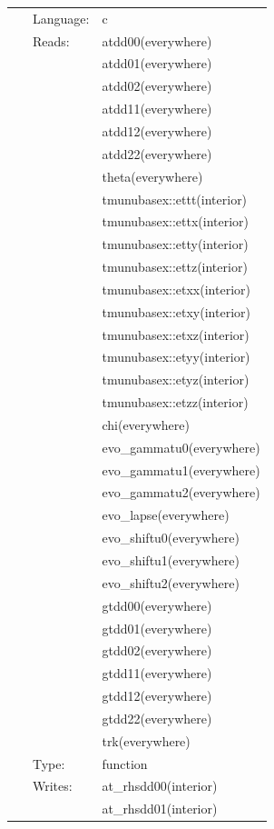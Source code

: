 \documentclass{article}
\begin{document}
 \begin{tabular*}{160mm}{cll} 
~ & Language:  & c \\ 
~ & Reads:  & atdd00(everywhere) \\ 
~& ~ &atdd01(everywhere)\\ 
~& ~ &atdd02(everywhere)\\ 
~& ~ &atdd11(everywhere)\\ 
~& ~ &atdd12(everywhere)\\ 
~& ~ &atdd22(everywhere)\\ 
~& ~ &theta(everywhere)\\ 
~& ~ &tmunubasex::ettt(interior)\\ 
~& ~ &tmunubasex::ettx(interior)\\ 
~& ~ &tmunubasex::etty(interior)\\ 
~& ~ &tmunubasex::ettz(interior)\\ 
~& ~ &tmunubasex::etxx(interior)\\ 
~& ~ &tmunubasex::etxy(interior)\\ 
~& ~ &tmunubasex::etxz(interior)\\ 
~& ~ &tmunubasex::etyy(interior)\\ 
~& ~ &tmunubasex::etyz(interior)\\ 
~& ~ &tmunubasex::etzz(interior)\\ 
~& ~ &chi(everywhere)\\ 
~& ~ &evo\_gammatu0(everywhere)\\ 
~& ~ &evo\_gammatu1(everywhere)\\ 
~& ~ &evo\_gammatu2(everywhere)\\ 
~& ~ &evo\_lapse(everywhere)\\ 
~& ~ &evo\_shiftu0(everywhere)\\ 
~& ~ &evo\_shiftu1(everywhere)\\ 
~& ~ &evo\_shiftu2(everywhere)\\ 
~& ~ &gtdd00(everywhere)\\ 
~& ~ &gtdd01(everywhere)\\ 
~& ~ &gtdd02(everywhere)\\ 
~& ~ &gtdd11(everywhere)\\ 
~& ~ &gtdd12(everywhere)\\ 
~& ~ &gtdd22(everywhere)\\ 
~& ~ &trk(everywhere)\\ 
~ & Type:  & function \\ 
~ & Writes:  & at\_rhsdd00(interior) \\ 
~& ~ &at\_rhsdd01(interior)\\ 

\end{tabular*}
\end{document}
